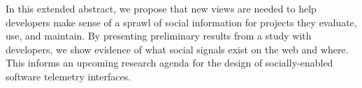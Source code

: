 In this extended abstract, we propose that new views are needed to help developers make sense of a sprawl of social information for projects they evaluate, use, and maintain.
By presenting preliminary results from a study with developers, we show evidence of what social signals exist on the web and where.
This informs an upcoming research agenda for the design of socially-enabled software telemetry interfaces.
